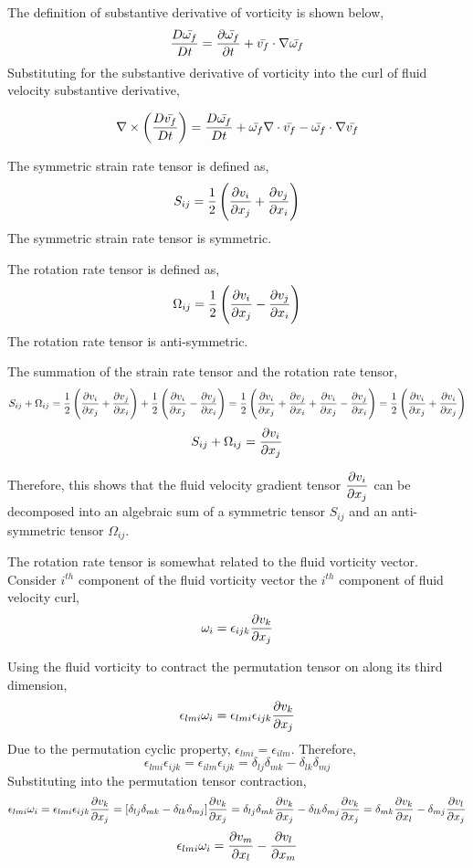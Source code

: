 \documentclass[class=report, 12pt, crop=false]{standalone}
\begin{document}
\begin{center}

The definition of substantive derivative of vorticity is shown below,
$$\frac{D \bar{\omega_f}}{Dt} = \frac{\partial \bar{\omega_f}}{\partial t} + \bar{v_f}\cdot\nabla \bar{\omega_f}$$
Substituting for the substantive derivative of vorticity into the curl of fluid velocity substantive derivative,

$$\nabla\times\left(\frac{D \bar{v_f}}{Dt}\right) = \frac{D \bar{\omega_f}}{Dt} + \bar{\omega_f}\nabla\cdot \bar{v_f} - \bar{\omega_f}\cdot\nabla \bar{v_f}$$





The symmetric strain rate tensor is defined as, 
$$S_{ij} = \frac{1}{2}\left(\frac{\partial v_i}{\partial x_j}+\frac{\partial v_j}{\partial x_i}\right)$$ 
The symmetric strain rate tensor is symmetric.

The rotation rate tensor is defined as,
$$\Omega_{ij} = \frac{1}{2}\left(\frac{\partial v_i}{\partial x_j}-\frac{\partial v_j}{\partial x_i}\right)$$
The rotation rate tensor is anti-symmetric.

The summation of the strain rate tensor and the rotation rate tensor,
$$S_{ij} + \Omega_{ij} = \frac{1}{2}\left(\frac{\partial v_i}{\partial x_j}+\frac{\partial v_j}{\partial x_i}\right) + \frac{1}{2}\left(\frac{\partial v_i}{\partial x_j}-\frac{\partial v_j}{\partial x_i}\right) = \frac{1}{2}\left(\frac{\partial v_i}{\partial x_j}+\frac{\partial v_j}{\partial x_i} + \frac{\partial v_i}{\partial x_j}-\frac{\partial v_j}{\partial x_i}\right) = \frac{1}{2}\left(\frac{\partial v_i}{\partial x_j} + \frac{\partial v_i}{\partial x_j}\right)$$
$$S_{ij} + \Omega_{ij} = \frac{\partial v_i}{\partial x_j}$$

Therefore, this shows that the fluid velocity gradient tensor $\displaystyle \frac{\partial v_i}{\partial x_j}$ can be decomposed into an algebraic sum of a symmetric tensor $S_{ij}$ and an anti-symmetric tensor $\Omega_{ij}$.



The rotation rate tensor is somewhat related to the fluid vorticity vector. Consider $i^{th}$ component of the fluid vorticity vector the $i^{th}$ component of fluid velocity curl,
$$\omega_i = \epsilon_{ijk}\frac{\partial v_k}{\partial x_j}$$


Using the fluid vorticity to contract the permutation tensor on along its third dimension,
$$\epsilon_{lmi}\omega_i = \epsilon_{lmi}\epsilon_{ijk}\frac{\partial v_k}{\partial x_j}$$
Due to the permutation cyclic property, $\epsilon_{lmi} = \epsilon_{ilm}$. Therefore,
$$\epsilon_{lmi}\epsilon_{ijk} = \epsilon_{ilm}\epsilon_{ijk} = \delta_{lj}\delta_{mk} - \delta_{lk}\delta_{mj}$$
Substituting into the permutation tensor contraction,
$$\epsilon_{lmi}\omega_i = \epsilon_{lmi}\epsilon_{ijk}\frac{\partial v_k}{\partial x_j} = [\delta_{lj}\delta_{mk} - \delta_{lk}\delta_{mj}]\frac{\partial v_k}{\partial x_j} = \delta_{lj}\delta_{mk}\frac{\partial v_k}{\partial x_j} - \delta_{lk}\delta_{mj}\frac{\partial v_k}{\partial x_j} = \delta_{mk}\frac{\partial v_k}{\partial x_l} - \delta_{mj}\frac{\partial v_l}{\partial x_j}$$
$$\epsilon_{lmi}\omega_i = \frac{\partial v_m}{\partial x_l} - \frac{\partial v_l}{\partial x_m}$$


\end{center}
\end{document}
